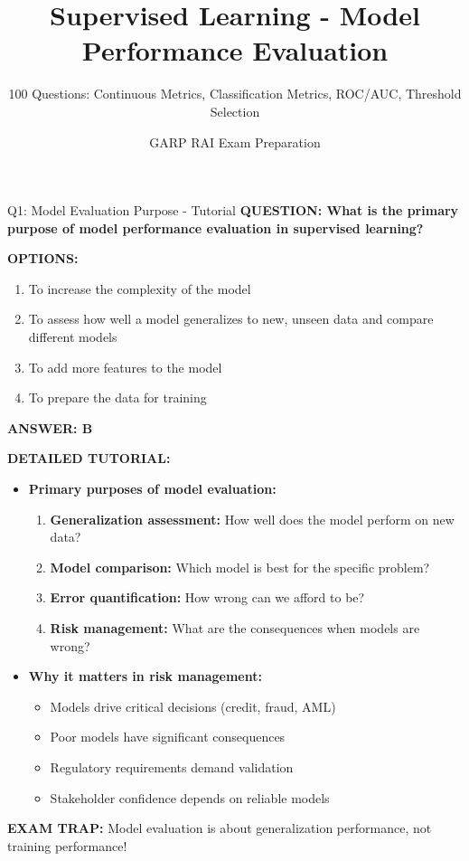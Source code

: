 \documentclass[8pt]{beamer}
\title{Supervised Learning - Model Performance Evaluation}
\subtitle{100 Questions: Continuous Metrics, Classification Metrics, ROC/AUC, Threshold Selection}
\author{GARP RAI Exam Preparation}
\date{}
\begin{document}
	
	\begin{frame}
		\titlepage
	\end{frame}
	
	
	\begin{frame}{Q1: Model Evaluation Purpose - Tutorial}
		\fontsize{6.5}{7.5}\selectfont
		\textbf{QUESTION: What is the primary purpose of model performance evaluation in supervised learning?}
		
		\vspace{0.1cm}
		\textbf{OPTIONS:}
		\begin{enumerate}
			\item To increase the complexity of the model
			\item To assess how well a model generalizes to new, unseen data and compare different models
			\item To add more features to the model
			\item To prepare the data for training
		\end{enumerate}
		
		\vspace{0.1cm}
		\textcolor{myblue}{\textbf{ANSWER: B}}
		
		\vspace{0.1cm}
		\textbf{DETAILED TUTORIAL:}
		\begin{itemize}
			\item \textbf{Primary purposes of model evaluation:}
			\begin{enumerate}
				\item \textbf{Generalization assessment:} How well does the model perform on new data?
				\item \textbf{Model comparison:} Which model is best for the specific problem?
				\item \textbf{Error quantification:} How wrong can we afford to be?
				\item \textbf{Risk management:} What are the consequences when models are wrong?
			\end{enumerate}
			\item \textbf{Why it matters in risk management:}
			\begin{itemize}
				\item Models drive critical decisions (credit, fraud, AML)
				\item Poor models have significant consequences
				\item Regulatory requirements demand validation
				\item Stakeholder confidence depends on reliable models
			\end{itemize}
		\end{itemize}
		
		\textcolor{myred}{\textbf{EXAM TRAP:}} Model evaluation is about \textcolor{myblue}{generalization performance}, not training performance!
	\end{frame}
	
\end{document}
